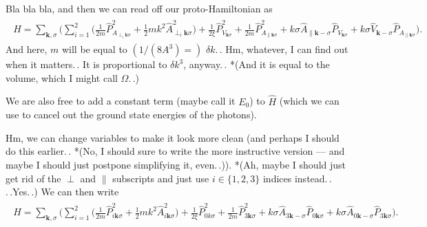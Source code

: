 \documentclass{report}
\begin{document}
Bla bla bla, and then we can read off our proto-Hamiltonian as
\begin{align}
\begin{aligned}
	\hat H = \sum_{\boldsymbol k, \sigma}\bigg(
		\sum_{i=1}^2 \Big( 
			\frac{1}{2m} \hat P^2_{{A}_{\perp_i \boldsymbol k \sigma}} +
			\frac{1}{2} m k^2 \hat{A}_{\perp_i \boldsymbol k \sigma}^2
		\Big) +
	\frac{1}{2\xi} \hat P^2_{V_{\boldsymbol k \sigma}} +
	\frac{1}{2m} \hat P^2_{A_{\parallel \boldsymbol k \sigma}} +
	k \sigma \hat{A}_{\| \boldsymbol k -\sigma} \hat P_{ V_{\boldsymbol k \sigma}} + 
	k \sigma  \hat{V}_{\boldsymbol k -\sigma} \hat P_{A_{\| \boldsymbol k \sigma}} \bigg).
\end{aligned} 
\end{align}
And here, $m$ will be equal to $(1/(8 A^3) =)\,\, \delta k.\,.$ Hm, whatever, I can find out when it matters.\,. It is proportional to $\delta k^3$, anyway.\,. *(And it is equal to the volume, which I might call $\Omega$.\,.)

We are also free to add a constant term (maybe call it $E_0$) to $\hat H$ (which we can use to cancel out the ground state energies of the photons). 

Hm, we can change variables to make it look more clean (and perhaps I should do this earlier.\,. *(No, I should sure to write the more instructive version --- and maybe I should just postpone simplifying it, even.\,.)). *(Ah, maybe I should just get rid of the $\perp$ and $\parallel$ subscripts and just use $i\in\{1, 2, 3\}$ indices instead.\,. .\,.Yes.\,.) We can then write
\begin{align}
\begin{aligned}
	\hat H = \sum_{\boldsymbol k, \sigma}\bigg(
		\sum_{i=1}^2 \Big( 
			\frac{1}{2m} \hat P^2_{i \boldsymbol k \sigma} +
			\frac{1}{2} m k^2 \hat{A}_{i \boldsymbol k \sigma}^2
		\Big) +
	\frac{1}{2\xi} \hat P^2_{0 k \sigma} +
	\frac{1}{2m} \hat P^2_{3 \boldsymbol k \sigma} +
	k \sigma \hat{A}_{3 \boldsymbol k -\sigma} \hat P_{0 \boldsymbol k \sigma} + 
	k \sigma  \hat{A}_{0 \boldsymbol k -\sigma} \hat P_{3 \boldsymbol k \sigma} \bigg).
\end{aligned} 
\end{align}
\end{document}
